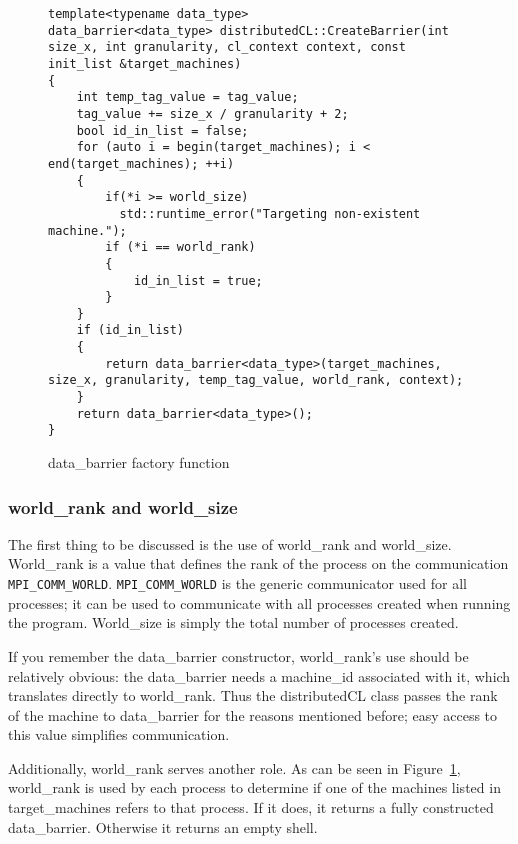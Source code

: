 \documentclass[../thesis.tex]{subfiles}
\begin{document}
    \begin{figure}[htbp]
        \centering
        \lstset{language=cpp}
        \begin{lstlisting}[tabsize=2]
template<typename data_type>
data_barrier<data_type> distributedCL::CreateBarrier(int size_x, int granularity, cl_context context, const init_list &target_machines)
{
    int temp_tag_value = tag_value;
    tag_value += size_x / granularity + 2;
    bool id_in_list = false;
    for (auto i = begin(target_machines); i < end(target_machines); ++i)
    {
        if(*i >= world_size)
          std::runtime_error("Targeting non-existent machine.");
        if (*i == world_rank)
        {
            id_in_list = true;
        }
    }
    if (id_in_list)
    {
        return data_barrier<data_type>(target_machines, size_x, granularity, temp_tag_value, world_rank, context);
    }
    return data_barrier<data_type>();
}
        \end{lstlisting}
        \caption{data\_barrier factory function}
        \label{fig:createbarrier_function}
    \end{figure}

    \subsubsection{world\_rank and world\_size} %
    \label{ssub:world_rank_and_world_size}
        The first thing to be discussed is the use of world\_rank and world\_size. World\_rank is a value that defines the rank of the process on the communication \texttt{MPI\_COMM\_WORLD}. \texttt{MPI\_COMM\_WORLD} is the generic communicator used for all processes; it can be used to communicate with all processes created when running the program. World\_size is simply the total number of processes created.

        If you remember the data\_barrier constructor, world\_rank's use should be relatively obvious: the data\_barrier needs a machine\_id associated with it, which translates directly to world\_rank. Thus the distributedCL class passes the rank of the machine to data\_barrier for the reasons mentioned before; easy access to this value simplifies communication.

        Additionally, world\_rank serves another role. As can be seen in Figure~\ref{fig:createbarrier_function}, world\_rank is used by each process to determine if one of the machines listed in target\_machines refers to that process. If it does, it returns a fully constructed data\_barrier. Otherwise it returns an empty shell.
\end{document}
